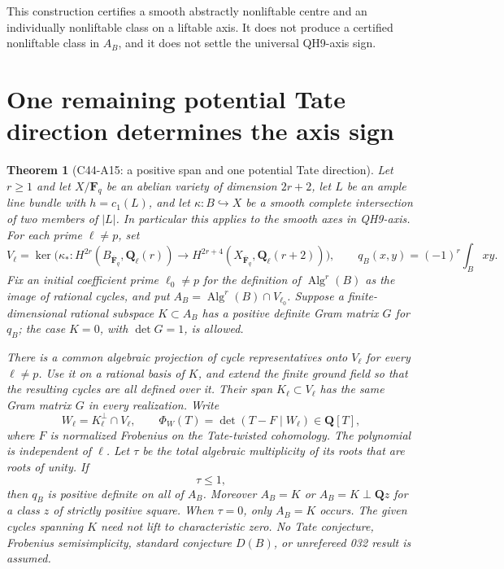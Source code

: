 \documentclass[11pt]{article}
\newtheorem{theorem}{Theorem}[section]
\theoremstyle{remark}\newtheorem{remark}[theorem]{Remark}
\DeclareMathOperator{\Alg}{Alg}
\begin{document}
This construction certifies a smooth abstractly nonliftable
centre and an individually nonliftable class on a liftable
axis. It does not produce a certified nonliftable class in
$A_B$, and it does not settle the universal QH9-axis sign.


\section{One remaining potential Tate direction determines the axis sign}
\label{sec:c44-a15}

\begin{theorem}[C44-A15: a positive span and one potential Tate direction]
Let $r\geq1$ and let $X/\mathbf F_q$ be an abelian variety of dimension $2r+2$,
let $L$ be an ample line bundle with $h=c_1(L)$, and let
$\kappa:B\hookrightarrow X$ be a smooth complete intersection
of two members of $|L|$. In particular this applies to
the smooth axes in QH9-axis. For each prime $\ell\ne p$, set
\[
 V_\ell=\ker\bigl(\kappa_*:H^{2r}(B_{\overline{\mathbf F}_q},
             \mathbf Q_\ell(r))\longrightarrow
        H^{2r+4}(X_{\overline{\mathbf F}_q},\mathbf Q_\ell(r+2))\bigr),
 \qquad q_B(x,y)=(-1)^r\int_Bxy.
 \tag{A15.1}
\]
Fix an initial coefficient prime $\ell_0\ne p$ for the definition
of $\Alg^r(B)$ as the image of rational cycles, and put
$A_B=\Alg^r(B)\cap V_{\ell_0}$.
Suppose a finite-dimensional rational subspace $K\subset A_B$
has a positive definite Gram matrix $G$ for $q_B$; the case
$K=0$, with $\det G=1$, is allowed.

There is a common algebraic projection of cycle representatives
onto $V_\ell$ for every $\ell\ne p$. Use it on a rational basis
of $K$, and extend the finite ground field so that the resulting
cycles are all defined over it. Their span $K_\ell\subset V_\ell$
has the same Gram matrix $G$ in every realization. Write
\[
       W_\ell=K_\ell^\perp\cap V_\ell,
 \qquad
       \Phi_W(T)=\det(T-F\mid W_\ell)\in\mathbf Q[T],
 \tag{A15.2}
\]
where $F$ is normalized Frobenius on the Tate-twisted cohomology.
The polynomial is independent of $\ell$. Let $\tau$ be the total
\emph{algebraic multiplicity} of its roots that are roots of
unity. If
\[
                              \tau\leq1,
 \tag{A15.3}
\]
then $q_B$ is positive definite on all of $A_B$.
Moreover $A_B=K$ or $A_B=K\perp\mathbf Qz$ for a class $z$ of
strictly positive square. When $\tau=0$, only $A_B=K$ occurs.
The given cycles spanning $K$ need not lift to characteristic zero.
No Tate conjecture, Frobenius semisimplicity, standard conjecture
$D(B)$, or unrefereed 032 result is assumed.
\end{theorem}
\end{document}
